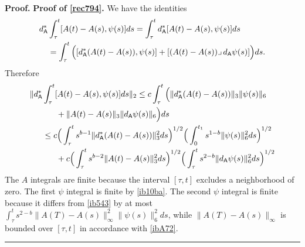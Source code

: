 \documentclass[12pt]{article}
\newenvironment{proof}[1][Proof]{\textbf{#1.} }{\ \rule{0.5em}{0.5em}}
\def \({\Big(}
\def \){\Big)}
\def \As{\mathsf{A}}
\def \eref{\eqref}
\def \lrc{\lrcorner\,}
\numberwithin{equation}{section}
\begin{document}
\begin{proof}
{\bf Proof of \eref{rec794}.}  
We have the identities 
\begin{align}
d_\As^*&\int_\tau^t [A(t) - A(s), \psi(s)]ds  =\int_\tau^t  d_\As^* [A(t) - A(s), \psi(s)]ds  \notag\\
&=\int_\tau^t \([  d_\As^*(A(t) - A(s)), \psi(s)] +[(A(t) - A(s))\lrc d_\As \psi(s)] \) ds. \notag 
\end{align}
Therefore
\begin{align}
\|d_\As^*&\int_\tau^t [A(t) - A(s), \psi(s)]ds\|_2 \le c\int_\tau^t   \(\| d_\As^*(A(t) - A(s))\|_3 \|\psi(s)\|_6 \notag\\
&\ \ \ \ \ +\|A(t) - A(s)\|_3 \| d_\As \psi(s)\|_6 \) ds \notag\\
&\le c \(\int_\tau^t s^{b-1} \| d_\As^*(A(t) - A(s))\|_3^2 ds\)^{1/2} 
                                \(\int_0^{t_1} s^{1-b} \|\psi(s)\|_6^2 ds \)^{1/2}\notag\\
&\ \ \ \ \  + c\(\int_\tau^t s^{b-2}\|A(t) - A(s)\|_3^2ds\)^{1/2}  \(\int_\tau^t s^{2-b} \| d_\As \psi(s)\|_6^2 ds\)^{1/2} \notag
\end{align}
 The $A$ integrals are finite because the interval $[\tau, t]$ excludes a neighborhood of zero.
The first $\psi$ integral is  finite by \eref{ib10ba}. The second $\psi$ integral is finite because it differs
from \eref{ib543}  by at most $\int_\tau^t s^{2-b}\|A(T) - A(s)\|_\infty^2 \| \psi(s)\|_6^2 ds$, while   
 $\|A(T) - A(s)\|_\infty$ is bounded over $[\tau, t]$ in accordance with \eref{ibA72}.
\end{proof}
\end{document}
